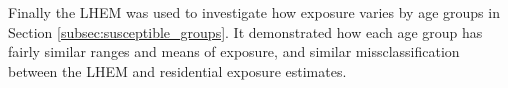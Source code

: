 
Finally the LHEM was used to investigate how exposure varies by age groups in Section \ref{subsec:susceptible_groups}. It demonstrated how each age group has fairly similar ranges and means of exposure, and similar missclassification between the LHEM and residential exposure estimates.